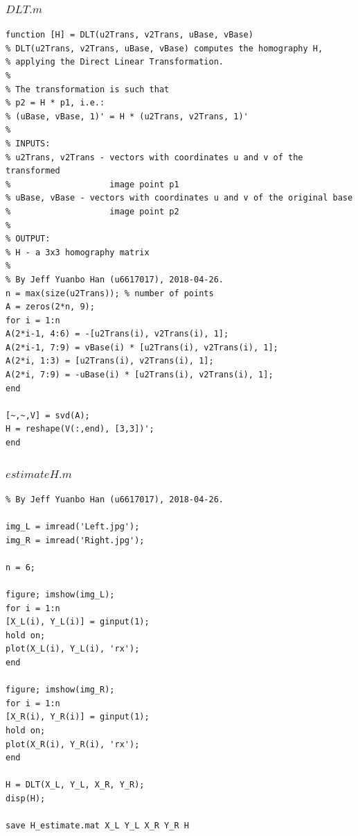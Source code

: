\documentclass{article}
\theoremstyle{plain} \newtheorem{prop}{Proposition}
\begin{document}
\subsubsection{$DLT.m$}
\label{code-4}
\begin{lstlisting}
function [H] = DLT(u2Trans, v2Trans, uBase, vBase)
% DLT(u2Trans, v2Trans, uBase, vBase) computes the homography H,
% applying the Direct Linear Transformation.
%
% The transformation is such that
% p2 = H * p1, i.e.:
% (uBase, vBase, 1)' = H * (u2Trans, v2Trans, 1)'
%
% INPUTS:
% u2Trans, v2Trans - vectors with coordinates u and v of the transformed
%                    image point p1
% uBase, vBase - vectors with coordinates u and v of the original base
%                    image point p2
%
% OUTPUT:
% H - a 3x3 homography matrix
%
% By Jeff Yuanbo Han (u6617017), 2018-04-26.
n = max(size(u2Trans)); % number of points
A = zeros(2*n, 9);
for i = 1:n
A(2*i-1, 4:6) = -[u2Trans(i), v2Trans(i), 1];
A(2*i-1, 7:9) = vBase(i) * [u2Trans(i), v2Trans(i), 1];
A(2*i, 1:3) = [u2Trans(i), v2Trans(i), 1];
A(2*i, 7:9) = -uBase(i) * [u2Trans(i), v2Trans(i), 1];
end

[~,~,V] = svd(A);
H = reshape(V(:,end), [3,3])';
end

\end{lstlisting}

\subsubsection{$estimateH.m$}
\label{code-5}
\begin{lstlisting}
% By Jeff Yuanbo Han (u6617017), 2018-04-26.

img_L = imread('Left.jpg');
img_R = imread('Right.jpg');

n = 6;

figure; imshow(img_L);
for i = 1:n
[X_L(i), Y_L(i)] = ginput(1);
hold on;
plot(X_L(i), Y_L(i), 'rx');
end

figure; imshow(img_R);
for i = 1:n
[X_R(i), Y_R(i)] = ginput(1);
hold on;
plot(X_R(i), Y_R(i), 'rx');
end

H = DLT(X_L, Y_L, X_R, Y_R);
disp(H);

save H_estimate.mat X_L Y_L X_R Y_R H

\end{lstlisting}
\end{document}
